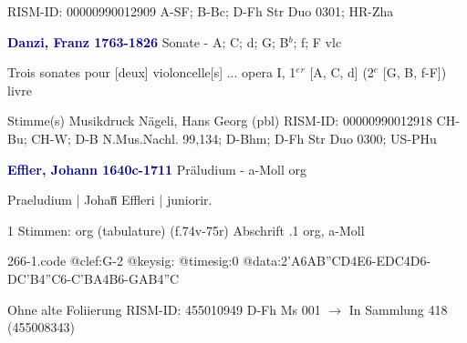 \documentclass[twocolumn]{book}
\begin{document}
\newline RISM-ID: 00000990012909
\newline A-SF; B-Bc; D-Fh  Str Duo 0301; HR-Zha
\newline \par \vspace{7pt} \textcolor{darkblue}{\textbf{Danzi, Franz  1763-1826}}
\newline Sonate - A; C; d; G; B$^b$; f; F
 vlc
\newline \begin{itshape}Trois sonates pour [deux] violoncelle[s] ... opera I, 1$^e$$^r$ [A, C, d] (2$^e$ [G, B, f-F]) livre\end{itshape} 
\newline \textcolor{darkblue}{}  Stimme(s)
\newline Musikdruck
\newline Nägeli, Hans Georg  (pbl)
\newline RISM-ID: 00000990012918
\newline CH-Bu; CH-W; D-B  N.Mus.Nachl. 99,134; D-Bhm; D-Fh  Str Duo 0300; US-PHu
\newline \par \vspace{7pt} \textcolor{darkblue}{\textbf{Effler, Johann  1640c-1711}}
\newline Präludium - a-Moll
\newline org
\newline \begin{itshape}[f.74v, at left:] Praeludium | Johan̅ Effleri | juniorir.\end{itshape} 
\newline \textcolor{darkblue}{}  1 Stimmen: org (tabulature)  (f.74v-75r)
\newline Abschrift
.1  org, a-Moll  
\begin{filecontents*}{266-1.code}
@clef:G-2
@keysig:
@timesig:0
@data:2'A{6AB''CD}4E6-{EDC}4D6-{DC'B}4''C6-{C'BA}4B6-{GAB}4''C
\end{filecontents*}
\newline
%
\newline Ohne alte Foliierung
\newline RISM-ID: 455010949
\newline D-Fh  Ms 001
\newline $\rightarrow$ In Sammlung 418 (455008343)
      
\end{document}
